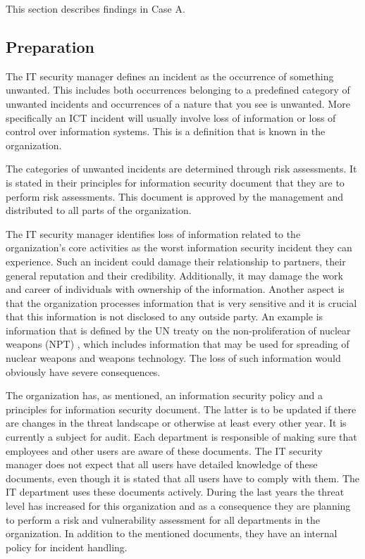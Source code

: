 This section describes findings in Case A. 

\subsection{Preparation}
The IT security manager defines an incident %
as the occurrence of something unwanted. This includes both occurrences belonging to a predefined category of unwanted incidents and occurrences of a nature that you see is unwanted. More specifically an \ac{ICT} incident will usually involve loss of information or loss of control over information systems. This is a definition that is known in the organization. 

The categories of unwanted incidents are determined through risk assessments. It is stated in their principles for information security document that they are to perform risk assessments. This document is approved by the management and distributed to all parts of the organization. %

The IT security manager identifies loss of information related to the organization's core activities as the worst information security incident they can experience. Such an incident could damage their relationship to partners, their general reputation and their credibility. Additionally, it may damage the work and career of individuals with ownership of the information. %
Another aspect is that the organization processes information that is very sensitive and it is crucial that this information is not disclosed to any outside party. An example is information that is defined by the \ac{UN} treaty on the non-proliferation of nuclear weapons (NPT) \cite{NPT}, which includes information that may be used for spreading of nuclear weapons and weapons technology. %
The loss of such information would obviously have severe consequences.

The organization has, as mentioned, an information security policy and a principles for information security document. The latter is to be updated if there are changes in the threat landscape or otherwise at least every other year. It is currently a subject for audit. Each department is responsible of making sure that employees and other users are aware of these documents. The IT security manager does not expect that all users have detailed knowledge of these documents, even though it is stated that all users have to comply with them. The IT department uses these documents actively. %
During the last years the threat level has increased for this organization and as a consequence they are planning to perform a risk and vulnerability assessment for all departments in the organization. In addition to the mentioned documents, they have an internal policy for incident handling.

